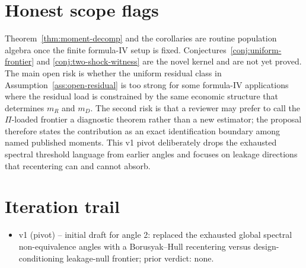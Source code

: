 \documentclass[11pt]{article}
\theoremstyle{definition}
\theoremstyle{plain}
\theoremstyle{remark}
\begin{document}
\section{Honest scope flags}
Theorem~\ref{thm:moment-decomp} and the corollaries are routine population algebra once the finite formula-IV setup is fixed.  Conjectures~\ref{conj:uniform-frontier} and \ref{conj:two-shock-witness} are the novel kernel and are not yet proved.  The main open risk is whether the uniform residual class in Assumption~\ref{ass:open-residual} is too strong for some formula-IV applications where the residual load is constrained by the same economic structure that determines \(m_R\) and \(m_D\).  The second risk is that a reviewer may prefer to call the \(\Pi\)-loaded frontier a diagnostic theorem rather than a new estimator; the proposal therefore states the contribution as an exact identification boundary among named published moments.  This v1 pivot deliberately drops the exhausted spectral threshold language from earlier angles and focuses on leakage directions that recentering can and cannot absorb.

\section{Iteration trail}
\begin{itemize}[leftmargin=*]
\item v1 (pivot) -- initial draft for angle 2: replaced the exhausted global spectral non-equivalence angles with a Borusyak--Hull recentering versus design-conditioning leakage-null frontier; prior verdict: none.
\end{itemize}
\end{document}
